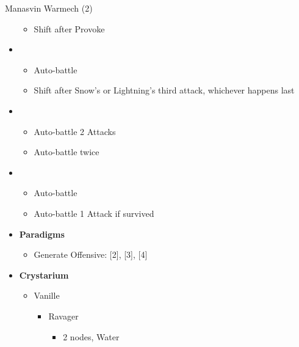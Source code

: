 \begin{battle}[0:52]{Manasvin Warmech (2)}
\begin{itemize}
			      \begin{itemize}
				      \item Shift after Provoke
			      \end{itemize}
			\item \third
			      \begin{itemize}
				      \item Auto-battle
				      \item Shift after Snow's or Lightning's third attack, whichever happens last
			      \end{itemize}
			\item \fourth
			      \begin{itemize}
				      \item Auto-battle 2 Attacks
				      \item Auto-battle twice
			      \end{itemize}
			\item \third
			      \begin{itemize}
				      \item Auto-battle
				      \item Auto-battle 1 Attack if survived
			      \end{itemize}
		\end{itemize}
	\end{battle}

	\begin{menu}
		\begin{itemize}
			\item \textbf{Paradigms}
			      \begin{itemize}
			      		\item Generate Offensive: [2], [3], [4]
			      \end{itemize}
			\item \textbf{Crystarium}
			      \begin{itemize}
				      \item Vanille
				            \begin{itemize}
					            \item Ravager
					                  \begin{itemize}
						                  \item 2 nodes, Water
					                  \end{itemize}
				            \end{itemize}
			      \end{itemize}
		\end{itemize}
	\end{menu}


